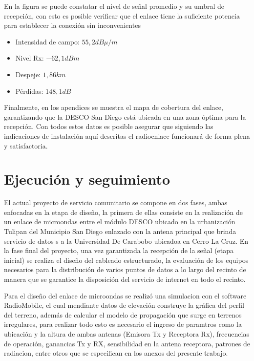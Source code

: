 \documentclass[11pt, a4paper, twosides]{report}
\begin{document}
En la figura se puede constatar el nivel de señal promedio y su umbral de recepción, con esto es posible verificar que el enlace tiene la suficiente potencia para establecer la conexión sin inconvenientes 

\begin{itemize}
\item Intensidad de campo: $55, 2dB\mu/m$
\item Nivel Rx: $-62,1dBm$
\item Despeje: $1, 86km$
\item Pérdidas: $148,1dB$
\end{itemize}

Finalmente, en los apendices se muestra el mapa de cobertura del enlace, garantizando que la DESCO-San Diego está ubicada en una zona óptima para la recepción. Con todos estos datos es posible asegurar que siguiendo las indicaciones de instalación aquí descritas el radioenlace funcionará de forma plena y satisfactoria.


\chapter{Ejecución y seguimiento}
El  actual proyecto de servicio comunitario se compone en dos fases, ambas enfocadas en la etapa de diseño, la primera de ellas consiste en la realización de un enlace de microondas entre el módulo DESCO ubicado en la urbanización Tulipan del Municipio San Diego enlazado con  la antena principal que brinda servicio de datos s a la Universidad De Carabobo ubicadoa en Cerro La Cruz. En la fase final del proyecto, una vez garantizada la recepción de la señal (etapa inicial) se realiza el diseño del cableado estructurado, la evaluación de los equipos necesarios para la distribución de varios puntos de datos a lo largo del recinto de manera que se garantice la  disposición del servicio de internet en todo el recinto. 

Para el diseño del enlace de microondas se realizó una  simulacion con el software RadioMobile, el cual mendiante datos de elevación construye la gráfica del perfil del terreno, además de calcular el modelo de propagación que surge en terrenos irregulares, para realizar todo esto es necesario el ingreso de paramtros como la ubicación y la altura de ambas antenas (Emisora Tx y Receptora Rx), frecuencias de operación, ganancias Tx y RX, sensibilidad en la antena receptora, patrones de radiacion, entre otros que se especifican en los anexos del presente trabajo.
\end{document}
